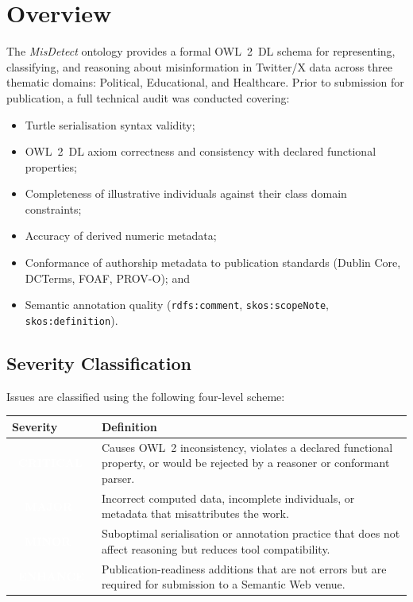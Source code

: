 \documentclass[11pt, a4paper]{article}
\newcommand{\badgeCritical}{\textcolor{white}{\colorbox{severity-critical}{\footnotesize\textbf{\ CRITICAL\ }}}}
\newcommand{\badgeMajor}{\textcolor{white}{\colorbox{severity-major}{\footnotesize\textbf{\ \ MAJOR\ \ }}}}
\newcommand{\badgeMinor}{\textcolor{white}{\colorbox{severity-minor}{\footnotesize\textbf{\ \ MINOR\ \ }}}}
\newcommand{\badgeEnhancement}{\textcolor{white}{\colorbox{cair-mid}{\footnotesize\textbf{\ ENHANCE\ }}}}
\begin{document}
\section{Overview}

The \emph{MisDetect} ontology provides a formal OWL~2~DL schema for
representing, classifying, and reasoning about misinformation in
Twitter/X data across three thematic domains: Political, Educational,
and Healthcare. Prior to submission for publication, a full technical
audit was conducted covering:

\begin{itemize}[leftmargin=1.4em, itemsep=2pt]
  \item Turtle serialisation syntax validity;
  \item OWL~2~DL axiom correctness and consistency with declared functional properties;
  \item Completeness of illustrative individuals against their class domain constraints;
  \item Accuracy of derived numeric metadata;
  \item Conformance of authorship metadata to publication standards
        (Dublin Core, DCTerms, FOAF, PROV-O); and
  \item Semantic annotation quality (\texttt{rdfs:comment}, \texttt{skos:scopeNote},
        \texttt{skos:definition}).
\end{itemize}

\subsection{Severity Classification}

Issues are classified using the following four-level scheme:

\vspace{4pt}
\begin{tabular}{@{} l L{11cm} @{}}
\toprule
\textbf{Severity} & \textbf{Definition} \\
\midrule
\badgeCritical & Causes OWL~2 inconsistency, violates a declared functional property,
                 or would be rejected by a reasoner or conformant parser. \\[4pt]
\badgeMajor    & Incorrect computed data, incomplete individuals, or metadata
                 that misattributes the work. \\[4pt]
\badgeMinor    & Suboptimal serialisation or annotation practice that does not
                 affect reasoning but reduces tool compatibility. \\[4pt]
\badgeEnhancement & Publication-readiness additions that are not errors but are
                    required for submission to a Semantic Web venue. \\
\bottomrule
\end{tabular}
\newpage
\end{document}
